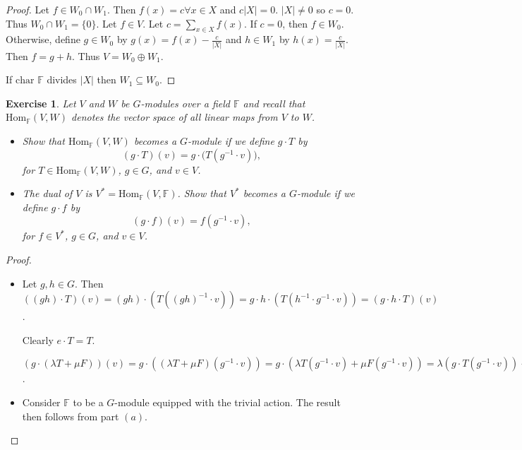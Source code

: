 \documentclass{article}
\newtheorem{exercise}[theorem]{Exercise}
\begin{document}
\begin{proof}
Let $f\in W_0\cap W_1$. Then $f(x)=c\forall x\in X$ and $c|X|=0$. $|X|\neq0$ so $c=0$. Thus $W_0\cap W_1=\{0\}$. Let $f\in V$. Let $c=\sum_{x\in X}f(x)$. If $c=0$, then $f\in W_0$. Otherwise, define $g\in W_0$ by $g(x)=f(x)-\frac{c}{|X|}$ and $h\in W_1$ by $h(x)=\frac{c}{|X|}$. Then $f=g+h$. Thus $V=W_0\oplus W_1$.

If $\text{char }\mathbb{F}$ divides $|X|$ then $W_1\subseteq W_0$.
\end{proof}

\begin{exercise}
Let \( V \) and \( W \) be \( G \)-modules over a field \( \mathbb{F} \) and recall that 
\(\mathrm{Hom}_{\mathbb{F}}(V, W)\) denotes the vector space of all linear maps from \( V \) to \( W \).

\begin{itemize}
    \item[(a)] Show that \(\mathrm{Hom}_{\mathbb{F}}(V, W)\) becomes a \( G \)-module if we define \( g \cdot T \) by
    \[
    (g \cdot T)(v) = g \cdot \big(T(g^{-1} \cdot v)\big),
    \]
    for \( T \in \mathrm{Hom}_{\mathbb{F}}(V, W) \), \( g \in G \), and \( v \in V \).

    \item[(b)] The dual of \( V \) is \( V^* = \mathrm{Hom}_{\mathbb{F}}(V, \mathbb{F}) \). Show that \( V^* \) becomes a \( G \)-module if we define \( g \cdot f \) by
    \[
    (g \cdot f)(v) = f(g^{-1} \cdot v),
    \]
    for \( f \in V^* \), \( g \in G \), and \( v \in V \).
\end{itemize}

\end{exercise}
\begin{proof}
\begin{itemize}
    \item[(a)]Let $g,h\in G$. Then $((gh)\cdot T)(v)=(gh)\cdot(T((gh)^{-1}\cdot v))=g\cdot h\cdot(T(h^{-1}\cdot g^{-1}\cdot v))=(g\cdot h\cdot T)(v)$.

    Clearly $e\cdot T=T$.

    $(g\cdot(\lambda T + \mu F))(v)=g\cdot((\lambda T+\mu F)(g^{-1}\cdot v))=g\cdot (\lambda T(g^{-1}\cdot v)+\mu F(g^{-1}\cdot v))=\lambda(g\cdot T(g^{-1}\cdot v))+\mu(g\cdot F(g^{-1}\cdot v))=\lambda(g\cdot T)(v)+\mu(g\cdot F(v))$.
    \item[(b)]Consider $\mathbb{F}$ to be a $G$-module equipped with the trivial action. The result then follows from part $(a)$.
\end{itemize}
\end{proof}
\end{document}
